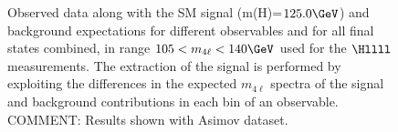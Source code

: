 \begin{figure}[!h!t]
\begin{center}
    \caption{Observed data along with the SM signal (m(H)=$125.0 \GeV$) and background expectations for different observables and for all final states combined, in range $105 < m_{4\ell} < 140 \GeV$ used for the $\Hllll$ measurements. The extraction of the signal is performed by exploiting the differences in the expected $m_{4\ell}$ spectra of the signal and background contributions in each bin of an observable. 
    COMMENT: Results shown with Asimov dataset.
    }
  \label{fig:differential-bins-asimov-2}
 \end{center}
\end{figure}


